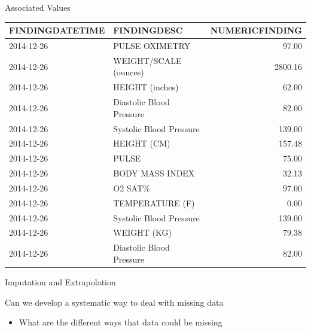 \documentclass[10pt, xcolor=table]{beamer}
\begin{document}
\begin{frame}{Associated Values}
\small
\begin{tabular}{llr}
\toprule
FINDINGDATETIME &               FINDINGDESC &  NUMERICFINDING \\
\midrule
     2014-12-26 &            PULSE OXIMETRY &           97.00 \\
     2014-12-26 &     WEIGHT/SCALE (ounces) &         2800.16 \\
     2014-12-26 &           HEIGHT (inches) &           62.00 \\
     2014-12-26 &  Diastolic Blood Pressure &           82.00 \\
     2014-12-26 &   Systolic Blood Pressure &          139.00 \\
     2014-12-26 &               HEIGHT (CM) &          157.48 \\
     2014-12-26 &                     PULSE &           75.00 \\
     2014-12-26 &           BODY MASS INDEX &           32.13 \\
     2014-12-26 &                   O2 SAT\% &           97.00 \\
     2014-12-26 &           TEMPERATURE (F) &            0.00 \\
     2014-12-26 &   Systolic Blood Pressure &          139.00 \\
     2014-12-26 &               WEIGHT (KG) &           79.38 \\
     2014-12-26 &  Diastolic Blood Pressure &           82.00 \\
\bottomrule
\end{tabular}
\end{frame}



\begin{frame}{Imputation and Extrapolation}
	\begin{center}
		\Large Can we develop a systematic way to deal with missing data
	\end{center}
	\begin{itemize}
		\item What are the different ways that data could be missing
	\end{itemize}
\end{frame}
\end{document}

